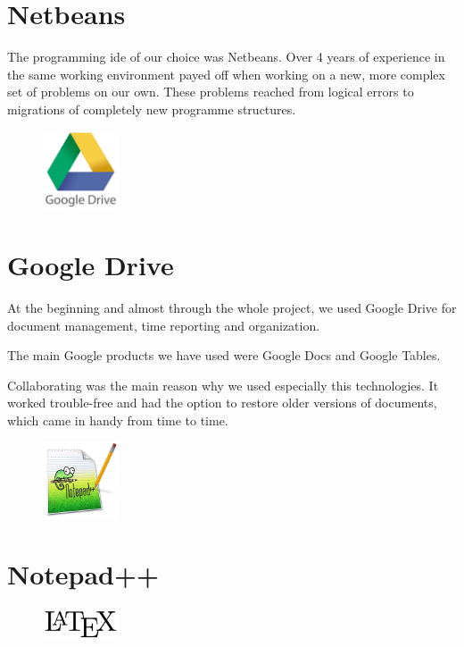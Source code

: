 \section{Netbeans}
The programming \gls{ide} of our choice was Netbeans. Over 4 years of experience in the same working environment payed off when working on a new, more complex set of problems on our own. These problems reached from logical errors to migrations of completely new programme structures. 
\begin{figure}
  \begin{center}
    \includegraphics[width=0.2\textwidth] {bilder/googledrive}
  \end{center}
\end{figure}
\section{Google Drive}
At the beginning and almost through the whole project, we used Google Drive for document management, time reporting and organization.

The main Google products we have used were Google Docs and Google Tables.

Collaborating was the main reason why we used especially this technologies. It worked trouble-free and had the option to restore older versions of documents, which came in handy from time to time.
\begin{figure}
  \begin{center}
    \includegraphics[width=0.2\textwidth] {bilder/Notepad}
  \end{center}
\end{figure}
\section{Notepad++}

\begin{figure}
  \begin{center}
    \includegraphics[width=0.2\textwidth] {bilder/LaTeX}
  \end{center}
\end{figure}
